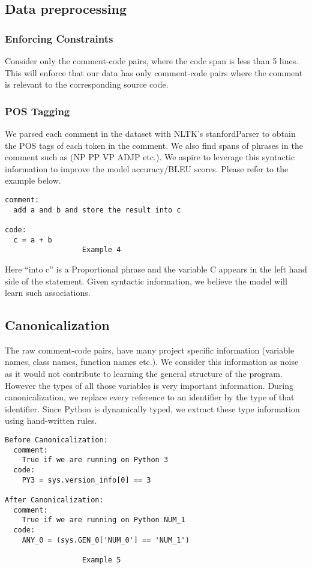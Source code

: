 \documentclass{IEEEtran}
\begin{document}
      \subsection{Data preprocessing}
      \subsubsection{Enforcing Constraints}
        Consider only the comment-code pairs, where the code span is less
        than 5 lines. This will enforce that our data has only comment-code
        pairs where the comment is relevant to the corresponding source code.
      \subsubsection{POS Tagging}
        We parsed each comment in the dataset with NLTK's stanfordParser to obtain
        the POS tags of each token in the comment. We also find spans of phrases
        in the comment such as (NP PP VP ADJP etc.). We aspire to leverage this
        syntactic information to improve the model accuracy/BLEU scores.
        Please refer to the example below.
      \begin{lstlisting}[frame=single,basicstyle=\small]
comment:  
  add a and b and store the result into c

code:
  c = a + b
                  Example 4
      \end{lstlisting}

      Here ``into c'' is a Proportional phrase and the variable C appears in the left hand side of the statement. 
        Given syntactic information, we believe the model will learn such associations.

    \subsection{Canonicalization}
    The raw comment-code pairs, have many project specific information
    (variable names, class names, function names etc.). We consider this
    information as noise as it would not contribute to learning the
    general structure of the program. However the types of all those variables
    is very important information. During canonicalization, we replace every
    reference to an identifier by the type of that identifier. Since Python
    is dynamically typed, we extract these type information using hand-written rules.

    \begin{lstlisting}[frame=single,basicstyle=\small]
Before Canonicalization:
  comment:
    True if we are running on Python 3
  code:
    PY3 = sys.version_info[0] == 3

After Canonicalization:
  comment:
    True if we are running on Python NUM_1
  code:                                     
    ANY_0 = (sys.GEN_0['NUM_0'] == 'NUM_1')

                  Example 5
    \end{lstlisting}
\end{document}
